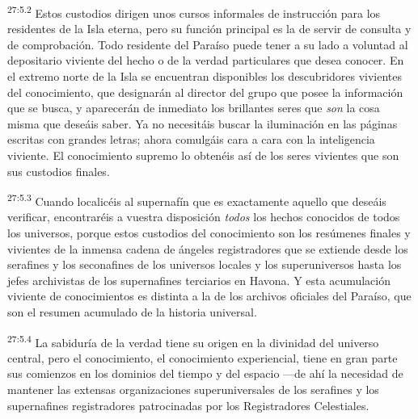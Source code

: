 \par
\textsuperscript{27:5.2} Estos custodios dirigen unos cursos informales de instrucción para los residentes de la Isla eterna, pero su función principal es la de servir de consulta y de comprobación. Todo residente del Paraíso puede tener a su lado a voluntad al depositario viviente del hecho o de la verdad particulares que desea conocer. En el extremo norte de la Isla se encuentran disponibles los descubridores vivientes del conocimiento, que designarán al director del grupo que posee la información que se busca, y aparecerán de inmediato los brillantes seres que \textit{son} la cosa misma que deseáis saber. Ya no necesitáis buscar la iluminación en las páginas escritas con grandes letras; ahora comulgáis cara a cara con la inteligencia viviente. El conocimiento supremo lo obtenéis así de los seres vivientes que son sus custodios finales.

\par
\textsuperscript{27:5.3} Cuando localicéis al supernafín que es exactamente aquello que deseáis verificar, encontraréis a vuestra disposición \textit{todos} los hechos conocidos de todos los universos, porque estos custodios del conocimiento son los resúmenes finales y vivientes de la inmensa cadena de ángeles registradores que se extiende desde los serafines y los seconafines de los universos locales y los superuniversos hasta los jefes archivistas de los supernafines terciarios en Havona. Y esta acumulación viviente de conocimientos es distinta a la de los archivos oficiales del Paraíso, que son el resumen acumulado de la historia universal.

\par
\textsuperscript{27:5.4} La sabiduría de la verdad tiene su origen en la divinidad del universo central, pero el conocimiento, el conocimiento experiencial, tiene en gran parte sus comienzos en los dominios del tiempo y del espacio ---de ahí la necesidad de mantener las extensas organizaciones superuniversales de los serafines y los supernafines registradores patrocinadas por los Registradores Celestiales.

